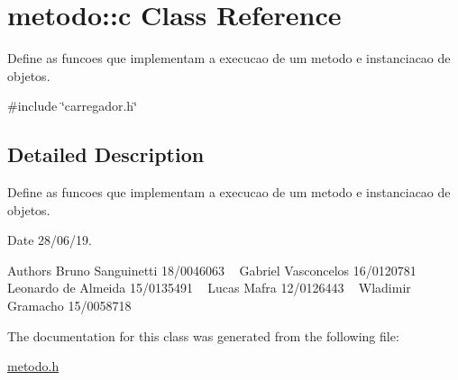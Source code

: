 \hypertarget{classmetodo_1_1c}{}\section{metodo\+::c Class Reference}
\label{classmetodo_1_1c}


Define as funcoes que implementam a execucao de um metodo e instanciacao de objetos.  




{\ttfamily \#include \char`\"{}carregador.\+h\char`\"{}}



\subsection{Detailed Description}
Define as funcoes que implementam a execucao de um metodo e instanciacao de objetos. 

\begin{DoxyDate}{Date}
28/06/19.
\end{DoxyDate}
\begin{DoxyAuthor}{Authors}
Bruno Sanguinetti 18/0046063 ~\newline
Gabriel Vasconcelos 16/0120781 ~\newline
Leonardo de Almeida 15/0135491 ~\newline
Lucas Mafra 12/0126443 ~\newline
Wladimir Gramacho 15/0058718 ~\newline

\end{DoxyAuthor}


The documentation for this class was generated from the following file\+:\begin{DoxyCompactItemize}
\item 
\mbox{\hyperlink{metodo_8h}{metodo.\+h}}\end{DoxyCompactItemize}
